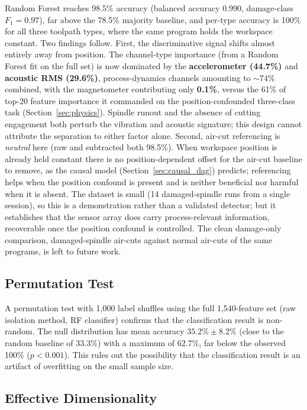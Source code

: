 Random Forest reaches 98.5\% accuracy (balanced accuracy 0.990, damage-class $F_1 = 0.97$), far above the 78.5\% majority baseline, and per-type accuracy is 100\% for all three toolpath types, where the same program holds the workspace constant. Two findings follow. First, the discriminative signal shifts almost entirely away from position. The channel-type importance (from a Random Forest fit on the full set) is now dominated by the \textbf{accelerometer (44.7\%)} and \textbf{acoustic RMS (29.6\%)}, process-dynamics channels amounting to $\sim$74\% combined, with the magnetometer contributing only \textbf{0.1\%}, versus the 61\% of top-20 feature importance it commanded on the position-confounded three-class task (Section~\ref{sec:physics}). Spindle runout and the absence of cutting engagement both perturb the vibration and acoustic signature; this design cannot attribute the separation to either factor alone. Second, air-cut referencing is \emph{neutral} here (raw and subtracted both 98.5\%). When workspace position is already held constant there is no position-dependent offset for the air-cut baseline to remove, as the causal model (Section~\ref{sec:causal_dag}) predicts; referencing helps when the position confound is present and is neither beneficial nor harmful when it is absent. The dataset is small (14 damaged-spindle runs from a single session), so this is a demonstration rather than a validated detector; but it establishes that the sensor array does carry process-relevant information, recoverable once the position confound is controlled. The clean damage-only comparison, damaged-spindle air-cuts against normal air-cuts of the same programs, is left to future work.

\subsection{Permutation Test}

A permutation test with 1{,}000 label shuffles using the full 1{,}540-feature set (raw isolation method, RF classifier) confirms that the classification result is non-random. The null distribution has mean accuracy $35.2\% \pm 8.2\%$ (close to the random baseline of $33.3\%$) with a maximum of 62.7\%, far below the observed 100\% ($p < 0.001$). This rules out the possibility that the classification result is an artifact of overfitting on the small sample size.

\subsection{Effective Dimensionality}

